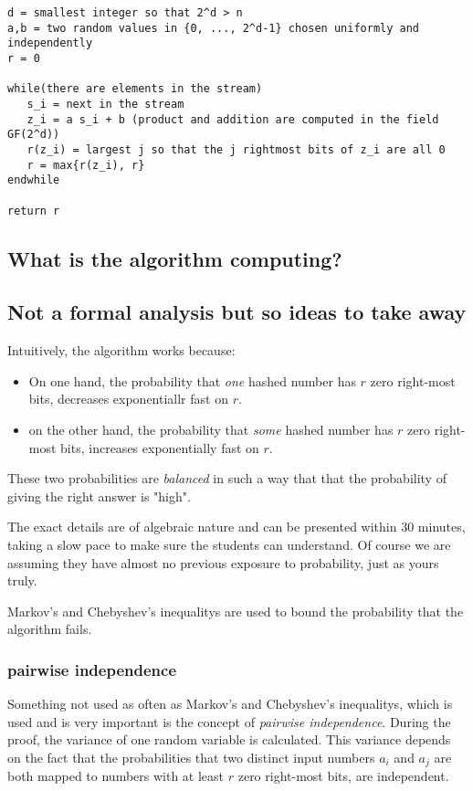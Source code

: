 \documentclass[12pt]{article}
\begin{document}
\begin{verbatim}
d = smallest integer so that 2^d > n
a,b = two random values in {0, ..., 2^d-1} chosen uniformly and independently
r = 0

while(there are elements in the stream)
   s_i = next in the stream
   z_i = a s_i + b (product and addition are computed in the field GF(2^d))
   r(z_i) = largest j so that the j rightmost bits of z_i are all 0
   r = max{r(z_i), r}       
endwhile

return r

\end{verbatim}



\subsection{What is the algorithm computing?}




\subsection{Not a formal analysis but so ideas to take away}

Intuitively, the algorithm works because:
\begin{itemize}
\item On one hand, the probability that \emph{one} hashed number has $r$ zero right-most  bits, decreases exponentiallr fast on $r$.
\item on the other hand, the probability that \emph{some} hashed number has $r$ zero right-most bits, increases exponentially fast on $r$.
\end{itemize}
These two probabilities are \emph{balanced} in such a way that that the probability of giving the right answer is "high".

The exact details are of algebraic nature and can be presented within 30 minutes, taking a slow pace to make sure the students can understand. Of course we are assuming they have almost no previous exposure to probability, just as yours truly.

Markov's and Chebyshev's inequalitys are used to bound the probability that the algorithm fails.

\subsubsection{pairwise independence}

Something not used as often as Markov's and Chebyshev's inequalitys, which is used and is very important 
is the concept of \emph{pairwise independence}. During the proof, the variance of one random variable is calculated. 
This variance depends on the fact that the probabilities that two distinct input numbers $a_i$ and $a_j$ are both mapped to numbers with at least $r$ zero right-most bits, are independent.
\end{document}
